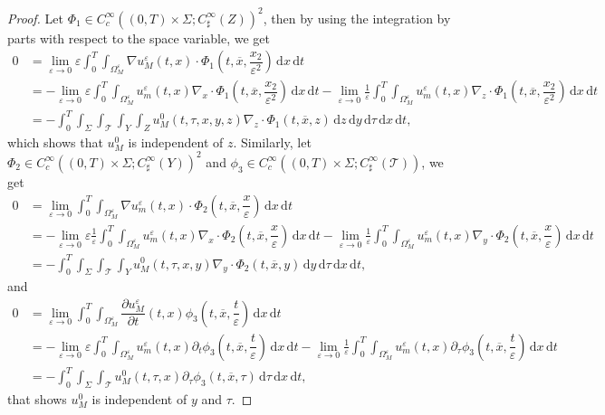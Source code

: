 \documentclass[11pt]{article}
\def\es{\varepsilon}
\def\omm{\Omega_M^\varepsilon}
\def\mint{\int_{0}^{T}\int_{\Sigma}\int_{\mathcal{T}}\int_{Y}\int_{Z}}
\def\T{\mathcal{T}}
\newcommand{\di}[1]{\,\mathrm{d}#1}
\begin{document}
\begin{proof}
        Let $\Phi_1\in C_c^\infty((0,T)\times\Sigma;C_{\sharp}^\infty(Z))^2$, then by using the integration by parts with respect to the space variable, we get
        \begin{align*}
            0&=\lim_{\es\rightarrow 0}\es\int_0^T\int_{\omm}\nabla u_M^\es(t,x)\cdot\Phi_1(t,\overline{x},\dfrac{x_2}{\es^2})\di{x}\di{t}\\
            &=-\lim_{\es\rightarrow 0}\es\int_0^T\int_{\omm} u_m^\es(t,x)\nabla_x\cdot \Phi_1(t,\overline{x},\dfrac{x_2}{\es^2})\di{x}\di{t}-\lim_{\es\rightarrow 0}\frac{1}{\es}\int_0^T\int_{\omm} u_m^\es(t,x)\nabla_z\cdot \Phi_1(t,\overline{x},\dfrac{x_2}{\es^2})\di{x}\di{t}\\
            &=-\mint u_M^0(t,\tau,x,y,z)\nabla_z\cdot \Phi_1(t,\overline{x},z)\di{z}\di{y}\di{\tau}\di{x}\di{t},
        \end{align*}
        which shows that $u_M^0$ is independent of $z$.  Similarly, let $\Phi_2\in  C_c^\infty((0,T)\times\Sigma;C_{\sharp}^\infty(Y))^2$ and $\phi_3\in  C_c^\infty((0,T)\times\Sigma;C_{\sharp}^\infty(\T))$, we get
        \begin{align*}
            0&=\lim_{\es\rightarrow 0}\int_0^T\int_{\omm}\nabla u_m^\es(t,x)\cdot \Phi_2(t,\overline{x},\dfrac{x}{\es})\di{x}\di{t}\\
            &=-\lim_{\es\rightarrow 0}\es\frac{1}{\es}\int_0^T\int_{\omm} u_m^\es(t,x)\nabla_x\cdot \Phi_2(t,\overline{x},\dfrac{x}{\es})\di{x}\di{t}-\lim_{\es\rightarrow 0}\frac{1}{\es}\int_0^T\int_{\omm} u_m^\es(t,x)\nabla_y\cdot\Phi_2(t,\overline{x},\dfrac{x}{\es})\di{x}\di{t}\\
            &=-\int_0^T\int_{\Sigma}\int_\T\int_{Y}u_M^0(t,\tau,x,y)\nabla_y\cdot\Phi_2(t,\overline{x},y)\di{y}\di{\tau}\di{x}\di{t},
        \end{align*}
        and 
        \begin{align*}
            0&=\lim_{\es\rightarrow 0}\int_0^T\int_{\omm}\dfrac{\partial u_M^\es}{\partial t}(t,x)\phi_3(t,\overline{x},\dfrac{t}{\es})\di{x}\di{t}\\
            &=-\lim_{\es\rightarrow 0}\es\int_0^T\int_{\omm} u_m^\es(t,x)\partial_t\phi_3(t,\overline{x},\dfrac{t}{\es})\di{x}\di{t}-\lim_{\es\rightarrow 0}\frac{1}{\es}\int_0^T\int_{\omm} u_m^\es(t,x)\partial_\tau \phi_3(t,\overline{x},\dfrac{t}{\es})\di{x}\di{t}\\
            &=-\int_0^T\int_{\Sigma}\int_\T u_M^0(t,\tau,x)\partial_\tau \phi_3(t,\overline{x},\tau)\di{\tau}\di{x}\di{t},
        \end{align*}
        that shows $u_M^0$ is independent of $y$ and $\tau$. 
        

\end{proof}
\end{document}
